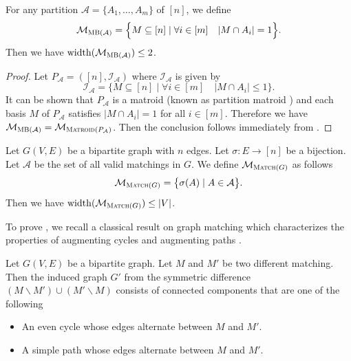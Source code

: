 \documentclass{article}
\newcommand{\M}{\mathcal M}
\newcommand{\del}{\backslash}
\DeclareMathOperator{\rank}{width}
\newcommand{\MultiBandit}{\textsc{MB}\xspace}
\newcommand{\Matroid}{\textsc{Matroid}\xspace}
\newcommand{\Match}{\textsc{Match}\xspace}
\begin{document}
\begin{fact}[\MultiBandit]
\label{fact:multibandit}
For any partition $\mathcal A =\{A_1,\ldots,A_m\}$ of $[n]$, we define
$$\M_{\MultiBandit(\mathcal A)} = \Big\{M\subseteq [n] \mid \forall i\in[m] \quad |M\cap A_i| = 1\Big\}.$$
Then we have $\rank(\M_{\MultiBandit(\mathcal A)}) \le 2$.
\end{fact}

\begin{proof}
Let $P_{\mathcal A}=([n], \mathcal I_{\mathcal A})$ where $\mathcal I_{\mathcal A}$ is given by
$$
\mathcal I_{\mathcal A} = \big\{M \subseteq [n] \mid \forall i\in[m] \quad |M\cap A_i| \le 1 \big\}.
$$
It can be shown that $P_{\mathcal A}$ is a matroid (known as partition matroid \citep{oxley2006matroid}) and each basis $M$ of $P_{\mathcal A}$
satisfies $|M\cap A_i| = 1$ for all $i\in [m]$.
Therefore we have $\M_{\MultiBandit(\mathcal A)}=\M_{\Matroid(P_{\mathcal A})}$. 
Then the conclusion follows immediately from .
\end{proof}



\begin{fact}[Matching]
\label{fact:match}
Let $G(V,E)$ be a bipartite graph with $n$ edges.
Let $\sigma\colon E\rightarrow [n]$ be a bijection.
Let $\mathcal A$ be the set of all valid matchings in $G$. 
We define $\M_{\Match(G)}$ as follows
$$
\M_{\Match(G)} = \big\{\sigma(A) \mid A\in\mathcal A \big\}.
$$
Then we have $\rank(\M_{\Match(G)}) \le |V|$. 
\end{fact}


To prove , we recall a classical result on graph matching which characterizes the properties of augmenting cycles and augmenting paths \citep{Berge15091957}.
\begin{lemma}
\label{lemma:match}
Let $G(V,E)$ be a bipartite graph.
Let $M$ and $M'$ be two different matching.
Then the induced graph $G'$ from the symmetric difference $(M\del M')\cup (M'\del M)$ consists of connected components that are one of the following
\begin{itemize}
\item An even cycle whose edges alternate between $M$ and $M'$.
\item A simple path whose edges alternate between $M$ and $M'$.
\end{itemize}
\end{lemma}
\end{document}
